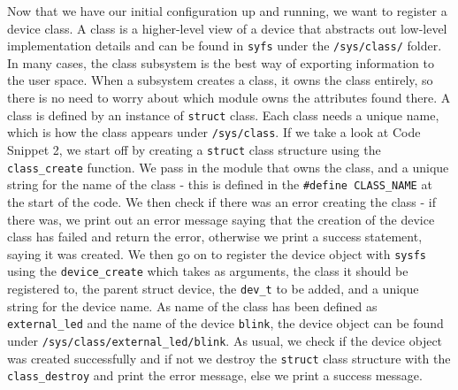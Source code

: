 \documentclass[a4paper,oneside,onecolumn]{article}
\newcommand{\code}[1]{\colorbox{codegray}{\texttt{#1}}}
\begin{document}
Now that we have our initial configuration up and running, we want to register a device class. A class is a higher-level view of a device that abstracts out low-level implementation details and can be found in \texttt{syfs} under the \texttt{/sys/class/} folder. In many cases, the class subsystem is the best way of exporting information to the user space. When a subsystem creates a class, it owns the class entirely, so there is no need to worry about which module owns the attributes found there.
\newline
A class is defined by an instance of \code{struct} class. Each class needs a unique name, which is how the class appears under \texttt{/sys/class}.
\newline
\newline
If we take a look at Code Snippet 2, we start off by creating a \code{struct} class structure using the \code{class\_create} function. We pass in the module that owns the class, and a unique string for the name of the class - this is defined in the \code{\#define CLASS\_NAME} at the start of the code. We then check if there was an error creating the class - if there was, we print out an error message saying that the creation of the device class has failed and return the error, otherwise we print a success statement, saying it was created.
\newline
\newline
We then go on to register the device object with \texttt{sysfs} using the \code{device\_create} which takes as arguments, the class it should be registered to, the parent struct device, the \texttt{dev\_t} to be added, and a unique string for the device name. As name of the class has been defined as \texttt{external\_led} and the name of the device \texttt{blink}, the device object can be found under \texttt{/sys/class/external\_led/blink}.
\newline
As usual, we check if the device object was created successfully and if not we destroy the \code{struct} class structure with the \code{class\_destroy} and print the error message, else we print a success message.
\end{document}
